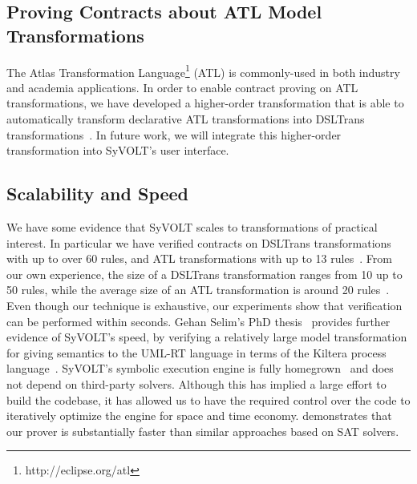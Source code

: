 \subsection{Proving Contracts about ATL Model Transformations}
The Atlas Transformation Language\footnote{http://eclipse.org/atl} (ATL) is
commonly-used in both industry and academia applications. In order to enable contract proving on ATL transformations, we
have developed a higher-order transformation that is able to automatically
transform declarative ATL transformations into DSLTrans transformations~\cite{Oakes}. 
In future work, we will integrate this higher-order transformation into SyVOLT's user interface.

\subsection{Scalability and Speed}

We have some evidence that SyVOLT scales to transformations of practical
interest. In particular we have verified contracts on DSLTrans transformations with up to
over 60 rules, and ATL transformations with up to 13 rules~\cite{Oakes}. From our own
experience, the size of a DSLTrans transformation ranges from 10 up to 50 rules, while the average size of an ATL
transformation is around 20 rules~\cite{KuselSWRSK13}.
Even though our technique is exhaustive, our experiments show that verification can be performed within seconds.
Gehan Selim's PhD thesis~\cite{Selim2015} provides further evidence of SyVOLT's speed, by verifying a relatively large model transformation
for giving semantics to the UML-RT language in terms of the Kiltera process
language~\cite{PosseDingel2014}. SyVOLT's symbolic execution engine is fully
homegrown~\cite{LucioVang} and does not depend on third-party solvers. Although
this has implied a large effort to build the codebase, it has allowed us to
have the required control over the code to iteratively optimize the engine for
space and time economy.
\cite{Selim2014} demonstrates that our prover is substantially faster than
similar approaches based on SAT solvers.








